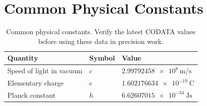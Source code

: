 \documentclass[../main.tex]{subfiles}
\begin{document}
\chapter{Common Physical Constants}

\begin{table}[H]
  \centering
  \caption{Common physical constants. Verify the latest CODATA values before
  using these data in precision work.}
  \begin{tabular}{@{}lll@{}}
    \toprule
    Quantity & Symbol & Value \\
    \midrule
    Speed of light in vacuum & $c$ & $\SI{2.99792458e8}{\metre\per\second}$ \\
    Elementary charge & $e$ & $\SI{1.602176634e-19}{\coulomb}$ \\
    Planck constant & $h$ & $\SI{6.62607015e-34}{\joule\second}$ \\
    \bottomrule
  \end{tabular}
\end{table}
\end{document}
